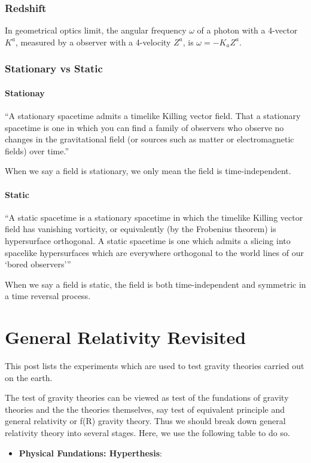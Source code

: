 \documentclass[letterpaper,10pt,english]{sphinxmanual}
\begin{document}
{\subsubsection{Redshift}
\label{GeneralRelativity:redshift}
In geometrical optics limit, the angular frequency $\omega$ of a photon with a 4-vector $K^a$, measured by a observer with a 4-velocity $Z^a$, is $\omega=-K_aZ^a$.


\subsubsection{Stationary vs Static}
\label{GeneralRelativity:stationary-vs-static}

\paragraph{Stationay}
\label{GeneralRelativity:stationay}
``A stationary spacetime admits a timelike Killing vector field. That a stationary spacetime is one in which you can find a family of observers who observe no changes in the gravitational field (or sources such as matter or electromagnetic fields) over time.''

When we say a field is stationary, we only mean the field is time-independent.


\paragraph{Static}
\label{GeneralRelativity:static}
``A static spacetime is a stationary spacetime in which the timelike Killing vector field has vanishing vorticity, or equivalently (by the Frobenius theorem) is hypersurface orthogonal. A static spacetime is one which admits a slicing into spacelike hypersurfaces which are everywhere orthogonal to the world lines of our `bored observers'''

When we say a field is static, the field is both time-independent and symmetric in a time reversal process.


\section{General Relativity Revisited}
\label{GeneralRelativityAdv:general-relativity-revisited}\label{GeneralRelativityAdv::doc}
This post lists the experiments which are used to test gravity theories
carried out on the earth.

The test of gravity theories can be viewed as test of the fundations of
gravity theories and the the theories themselves, say test of equivalent
principle and general relativity or f(R) gravity theory. Thus we should
break down general relativity theory into several stages. Here, we use
the following table to do so.
\begin{itemize}
\item {} 
\textbf{Physical Fundations: Hyperthesis}:


\end{itemize}}
\end{document}

